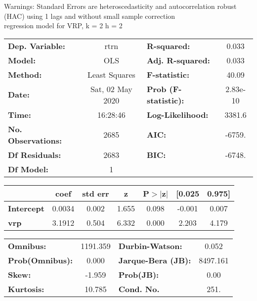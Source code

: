 Warnings: \newline
 [1] Standard Errors are heteroscedasticity and autocorrelation robust (HAC) using 1 lags and without small sample correction\\ 

regression model for VRP, k = 2 h = 2\begin{center}
\begin{tabular}{lclc}
\toprule
\textbf{Dep. Variable:}    &       rtrn       & \textbf{  R-squared:         } &     0.033   \\
\textbf{Model:}            &       OLS        & \textbf{  Adj. R-squared:    } &     0.033   \\
\textbf{Method:}           &  Least Squares   & \textbf{  F-statistic:       } &     40.09   \\
\textbf{Date:}             & Sat, 02 May 2020 & \textbf{  Prob (F-statistic):} &  2.83e-10   \\
\textbf{Time:}             &     16:28:46     & \textbf{  Log-Likelihood:    } &    3381.6   \\
\textbf{No. Observations:} &        2685      & \textbf{  AIC:               } &    -6759.   \\
\textbf{Df Residuals:}     &        2683      & \textbf{  BIC:               } &    -6748.   \\
\textbf{Df Model:}         &           1      & \textbf{                     } &             \\
\bottomrule
\end{tabular}
\begin{tabular}{lcccccc}
                   & \textbf{coef} & \textbf{std err} & \textbf{z} & \textbf{P$> |$z$|$} & \textbf{[0.025} & \textbf{0.975]}  \\
\midrule
\textbf{Intercept} &       0.0034  &        0.002     &     1.655  &         0.098        &       -0.001    &        0.007     \\
\textbf{vrp}       &       3.1912  &        0.504     &     6.332  &         0.000        &        2.203    &        4.179     \\
\bottomrule
\end{tabular}
\begin{tabular}{lclc}
\textbf{Omnibus:}       & 1191.359 & \textbf{  Durbin-Watson:     } &    0.052  \\
\textbf{Prob(Omnibus):} &   0.000  & \textbf{  Jarque-Bera (JB):  } & 8497.161  \\
\textbf{Skew:}          &  -1.959  & \textbf{  Prob(JB):          } &     0.00  \\
\textbf{Kurtosis:}      &  10.785  & \textbf{  Cond. No.          } &     251.  \\
\bottomrule
\end{tabular}
\end{center}

